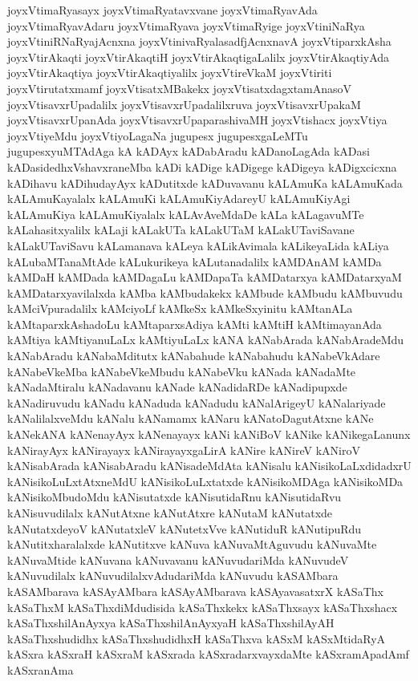 {joyxVtimaRyasayx
joyxVtimaRyatavxvane
joyxVtimaRyavAda
joyxVtimaRyavAdaru
joyxVtimaRyava
joyxVtimaRyige
joyxVtiniNaRya
joyxVtiniRNaRyajAcnxna
joyxVtinivaRyalasadfjAcnxnavA
joyxVtiparxkAsha
joyxVtirAkaqti
joyxVtirAkaqtiH
joyxVtirAkaqtigaLalilx
joyxVtirAkaqtiyAda
joyxVtirAkaqtiya
joyxVtirAkaqtiyalilx
joyxVtireVkaM
joyxVtiriti
joyxVtirutatxmamf
joyxVtisatxMBakekx
joyxVtisatxdagxtamAnasoV
joyxVtisavxrUpadalilx
joyxVtisavxrUpadalilxruva
joyxVtisavxrUpakaM
joyxVtisavxrUpanAda
joyxVtisavxrUpaparashivaMH
joyxVtishacx
joyxVtiya
joyxVtiyeMdu
joyxVtiyoLagaNa
jugupesx
jugupesxgaLeMTu
jugupesxyuMTAdAga
kA
kADAyx
kADabAradu
kADanoLagAda
kADasi
kADasidedhxVshavxraneMba
kADi
kADige
kADigege
kADigeya
kADigxcicxna
kADihavu
kADihudayAyx
kADutitxde
kADuvavanu
kALAmuKa
kALAmuKada
kALAmuKayalalx
kALAmuKi
kALAmuKiyAdareyU
kALAmuKiyAgi
kALAmuKiya
kALAmuKiyalalx
kALAvAveMdaDe
kALa
kALagavuMTe
kALahasitxyalilx
kALaji
kALakUTa
kALakUTaM
kALakUTaviSavane
kALakUTaviSavu
kALamanava
kALeya
kALikAvimala
kALikeyaLida
kALiya
kALubaMTanaMtAde
kALukurikeya
kALutanadalilx
kAMDAnAM
kAMDa
kAMDaH
kAMDada
kAMDagaLu
kAMDapaTa
kAMDatarxya
kAMDatarxyaM
kAMDatarxyavilalxda
kAMba
kAMbudakekx
kAMbude
kAMbudu
kAMbuvudu
kAMciVpuradalilx
kAMciyoLf
kAMkeSx
kAMkeSxyinitu
kAMtanALa
kAMtaparxkAshadoLu
kAMtaparxsAdiya
kAMti
kAMtiH
kAMtimayanAda
kAMtiya
kAMtiyanuLaLx
kAMtiyuLaLx
kANA
kANabArada
kANabAradeMdu
kANabAradu
kANabaMditutx
kANabahude
kANabahudu
kANabeVkAdare
kANabeVkeMba
kANabeVkeMbudu
kANabeVku
kANada
kANadaMte
kANadaMtiralu
kANadavanu
kANade
kANadidaRDe
kANadipupxde
kANadiruvudu
kANadu
kANaduda
kANadudu
kANalArigeyU
kANalariyade
kANalilalxveMdu
kANalu
kANamamx
kANaru
kANatoDagutAtxne
kANe
kANekANA
kANenayAyx
kANenayayx
kANi
kANiBoV
kANike
kANikegaLanunx
kANirayAyx
kANirayayx
kANirayayxgaLirA
kANire
kANireV
kANiroV
kANisabArada
kANisabAradu
kANisadeMdAta
kANisalu
kANisikoLaLxdidadxrU
kANisikoLuLxtAtxneMdU
kANisikoLuLxtatxde
kANisikoMDAga
kANisikoMDa
kANisikoMbudoMdu
kANisutatxde
kANisutidaRnu
kANisutidaRvu
kANisuvudilalx
kANutAtxne
kANutAtxre
kANutaM
kANutatxde
kANutatxdeyoV
kANutatxleV
kANutetxVve
kANutiduR
kANutipuRdu
kANutitxharalalxde
kANutitxve
kANuva
kANuvaMtAguvudu
kANuvaMte
kANuvaMtide
kANuvana
kANuvavanu
kANuvudariMda
kANuvudeV
kANuvudilalx
kANuvudilalxvAdudariMda
kANuvudu
kASAMbara
kASAMbarava
kASAyAMbara
kASAyAMbarava
kASAyavasatxrX
kASaThx
kASaThxM
kASaThxdiMdudisida
kASaThxkekx
kASaThxsayx
kASaThxshacx
kASaThxshilAnAyxya
kASaThxshilAnAyxyaH
kASaThxshilAyAH
kASaThxshudidhx
kASaThxshudidhxH
kASaThxva
kASxM
kASxMtidaRyA
kASxra
kASxraH
kASxraM
kASxrada
kASxradarxvayxdaMte
kASxramApadAmf
kASxranAma
}
